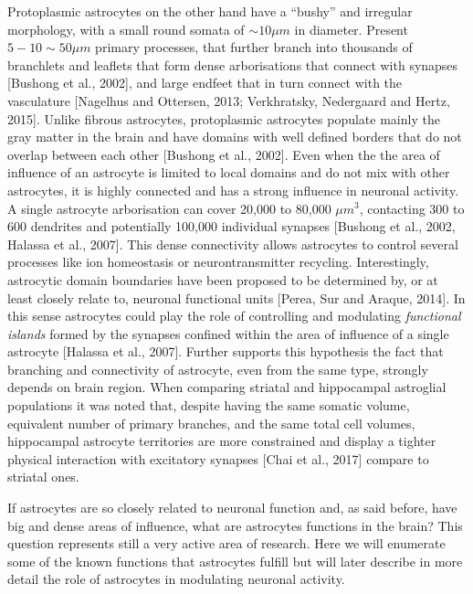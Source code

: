 Protoplasmic astrocytes on the other hand have a “bushy” and irregular morphology, with a small round somata of $\sim 10 \mu m$ in diameter.
Present $5-10 \sim 50 \mu m$ primary processes, that further branch into thousands of branchlets and leaflets that form dense arborisations that connect with synapses [Bushong et al., 2002], and large endfeet that in turn connect with the vasculature [Nagelhus and Ottersen, 2013; Verkhratsky, Nedergaard and Hertz, 2015].
Unlike fibrous astrocytes, protoplasmic astrocytes populate mainly the gray matter in the brain and have domains with well defined borders that do not overlap between each other [Bushong et al., 2002].
Even when the the area of influence of an astrocyte is limited to local domains and do not mix with other astrocytes, it is highly connected and has a strong influence in neuronal activity.  
A single astrocyte arborisation can cover 20,000 to 80,000 $\mu m^3$, contacting 300 to 600 dendrites and potentially 100,000 individual synapses [Bushong et al., 2002, Halassa et al., 2007].
This dense connectivity allows astrocytes to control several processes like ion homeostasis or neurontransmitter recycling.
Interestingly, astrocytic domain boundaries have been proposed to be determined by, or at least closely relate to, neuronal functional units [Perea, Sur and Araque, 2014].
In this sense astrocytes could play the role of controlling and modulating \textit{functional islands} formed by the synapses confined within the area of influence of a single astrocyte [Halassa et al., 2007].
Further supports this hypothesis the fact that branching and connectivity of astrocyte, even from the same type, strongly depends on brain region.  
When comparing striatal and hippocampal astroglial populations it was noted that, despite having the same somatic volume, equivalent number of primary branches, and the same total cell volumes, hippocampal astrocyte territories are more constrained and display a tighter physical interaction with excitatory synapses [Chai et al., 2017] compare to striatal ones.

If astrocytes are so closely related to neuronal function and, as said before, have big and dense areas of influence, what are astrocytes functions in the brain? 
This question represents still a very active area of research. Here we will enumerate some of the known functions that astrocytes fulfill but will later describe in more detail the role of astrocytes in modulating neuronal activity. 

